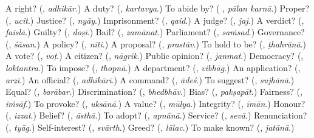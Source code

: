 \begin{tcolorbox}[breakable,colback=teal!4,colframe=teal!35!black,title={Before you move on}]
A right? (\textbf{}, \emph{adhikār}.) A duty? (\textbf{}, \emph{kartavya}.) To abide by? (\textbf{ }, \emph{pālan karnā}.) Proper? (\textbf{}, \emph{ucit}.) Justice? (\textbf{}, \emph{nyāy}.) Imprisonment? (\textbf{}, \emph{qaid}.) A judge? (\textbf{}, \emph{jaj}.) A verdict? (\textbf{}, \emph{faislā}.) Guilty? (\textbf{}, \emph{doṣī}.) Bail? (\textbf{}, \emph{zamānat}.) Parliament? (\textbf{}, \emph{saṁsad}.) Governance? (\textbf{}, \emph{śāsan}.) A policy? (\textbf{}, \emph{nīti}.) A proposal? (\textbf{}, \emph{prastāv}.) To hold to be? (\textbf{}, \emph{ṭhahrānā}.) A vote? (\textbf{}, \emph{voṭ}.) A citizen? (\textbf{}, \emph{nāgrik}.) Public opinion? (\textbf{}, \emph{janmat}.) Democracy? (\textbf{}, \emph{loktantra}.) To impose? (\textbf{}, \emph{thopnā}.) A department? (\textbf{}, \emph{vibhāg}.) An application? (\textbf{}, \emph{arzī}.) An official? (\textbf{}, \emph{adhikārī}.) A command? (\textbf{}, \emph{ādeś}.) To suggest? (\textbf{}, \emph{sujhānā}.) Equal? (\textbf{}, \emph{barābar}.) Discrimination? (\textbf{}, \emph{bhedbhāv}.) Bias? (\textbf{}, \emph{pakṣapāt}.) Fairness? (\textbf{}, \emph{iṁsāf}.) To provoke? (\textbf{}, \emph{uksānā}.) A value? (\textbf{}, \emph{mūlya}.) Integrity? (\textbf{}, \emph{īmān}.) Honour? (\textbf{}, \emph{izzat}.) Belief? (\textbf{}, \emph{āsthā}.) To adopt? (\textbf{}, \emph{apnānā}.) Service? (\textbf{}, \emph{sevā}.) Renunciation? (\textbf{}, \emph{tyāg}.) Self-interest? (\textbf{}, \emph{svārth}.) Greed? (\textbf{}, \emph{lālac}.) To make known? (\textbf{}, \emph{jatānā}.)
\end{tcolorbox}
